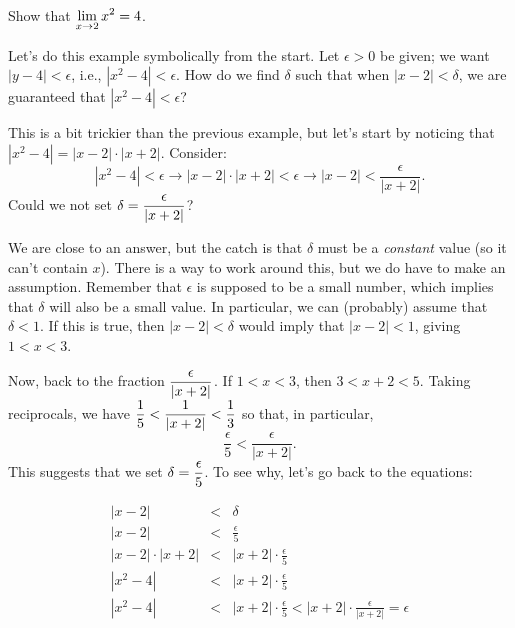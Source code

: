 \begin{example} \label{Ex:1.4.Eg2} 
Show that $\displaystyle \lim_{x \to 2} x^2 = 4$.

\solution Let's do this example symbolically from the start.  Let $\epsilon > 0$ be given; we want $|y-4| < \epsilon$, i.e.,  $|x^2-4| < \epsilon$.  How do we find $\delta$ such that when $|x-2| < \delta$, we are guaranteed that $|x^2-4|<\epsilon$?%

This is a bit trickier than the previous example, but let's start by noticing that 
$|x^2-4| = |x-2|\cdot|x+2|$.  Consider:
\begin{equation} |x^2-4| < \epsilon \longrightarrow |x-2|\cdot|x+2| < \epsilon \longrightarrow |x-2| < \frac{\epsilon}{|x+2|}.
\label{eq:limit1}
\end{equation} 
Could we not set $\displaystyle \delta = \frac{\epsilon}{|x+2|}$?  

We are close to an answer, but the catch is that $\delta$ must be a \textit{constant} value (so it can't contain $x$).  There is a way to work around this, but we do have to make an assumption.  Remember that $\epsilon$ is supposed to be a small number, which implies that $\delta$ will also be a small value.  In particular, we can (probably) assume that $\delta < 1$.  If this is true, then $|x-2| < \delta$ would imply that $|x-2| < 1$, giving $1 < x < 3$.  

Now, back to the fraction $\displaystyle \frac{\epsilon}{|x+2|}$.  If $1<x<3$, then $3<x+2<5$.  Taking reciprocals, we have $\displaystyle \frac{1}{5}<\frac{1}{|x+2|}<\frac{1}{3}$ so that, in particular, 
\begin{equation} \frac{\epsilon}{5}<\frac{\epsilon}{|x+2|}.
\label{eq:limit2}
\end{equation}  
This suggests that we set 
$\displaystyle \delta = \frac{\epsilon}{5}$. To see why, let's go back to the equations:

\begin{eqnarray*}
|x - 2| &<& \delta \\
|x - 2| &<& \frac{\epsilon}{5} \\%
|x - 2|\cdot|x + 2| &<& |x + 2|\cdot\frac{\epsilon}{5} \\%
|x^2 - 4|&<& |x + 2|\cdot\frac{\epsilon}{5} \\%
|x^2 - 4|&<& |x + 2|\cdot\frac{\epsilon}{5} <|x + 2|\cdot\frac{\epsilon}{|x+2|}=\epsilon  %
\end{eqnarray*}


\end{example}
